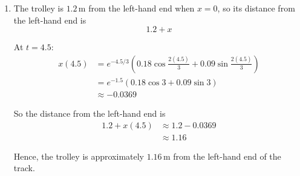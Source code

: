 \documentclass[leqno]{article}
\begin{document}
\begin{enumerate}[
  label=\textbf{\arabic*.},
  leftmargin=*,
  topsep=0pt,
  partopsep=0pt,
  parsep=0pt
]
\begin{djsSolution}
\begin{enumerate}[label=\textbf{(\alph*)}]
The auxiliary equation is
\[
9\lambda^2+6\lambda+5=0
\]

which has roots $\lambda=-\frac13\pm\frac23i$.

So the complementary function is
\[
x_c=e^{-t/3}\left(A\cos\frac{2t}{3}+B\sin\frac{2t}{3}\right)
\]

Since the equation is homogeneous, this is the general solution.  
Now use the initial conditions to find the required particular solution.

First, use $x(0)=0.18$:
\begin{align*}
0.18
&=e^0\left(A\cos 0+B\sin 0\right)\\
&=A
\end{align*}

So
\[
A=0.18
\]

Now differentiate:
\begin{align*}
\frac{\mathrm{d}x}{\mathrm{d}t}
&= -\frac13 e^{-t/3}\left(A\cos\frac{2t}{3}+B\sin\frac{2t}{3}\right)
+e^{-t/3}\left(-\frac{2A}{3}\sin\frac{2t}{3}+\frac{2B}{3}\cos\frac{2t}{3}\right)
\end{align*}

When $t=0$:
\begin{align*}
0
&= -\frac13(A)+\frac23(B)\\
0&=-A+2B
\end{align*}

So
\[
2B=A
\]

Since $A=0.18$:
\[
2B=0.18
\]
\[
B=0.09
\]

Hence the particular solution is
\[
x=e^{-t/3}\left(0.18\cos\frac{2t}{3}+0.09\sin\frac{2t}{3}\right)
\]

  \item The trolley is $1.2\,\mathrm{m}$ from the left-hand end when $x=0$, so its distance from the left-hand end is
\[
1.2+x
\]

At $t=4.5$:
\begin{align*}
x(4.5)
&=e^{-4.5/3}\left(0.18\cos\frac{2(4.5)}{3}+0.09\sin\frac{2(4.5)}{3}\right)\\
&=e^{-1.5}\left(0.18\cos 3+0.09\sin 3\right)\\
&\approx -0.0369
\end{align*}

So the distance from the left-hand end is
\begin{align*}
1.2+x(4.5)&\approx 1.2-0.0369\\
&\approx 1.16
\end{align*}

Hence, the trolley is approximately $1.16\,\mathrm{m}$ from the left-hand end of the track.


\end{enumerate}
\end{djsSolution}
\end{enumerate}
\end{document}
